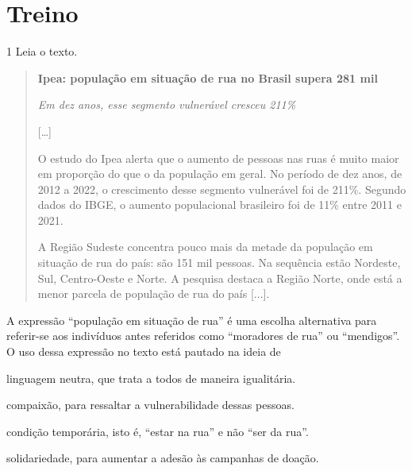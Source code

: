 \section{Treino}

\num{1} Leia o texto.

\begin{quote}
\centering\textbf{Ipea: população em situação de rua no Brasil supera 281 mil}

\centering\emph{Em dez anos, esse segmento vulnerável cresceu 211\%}

{[}\ldots{]}

O estudo do Ipea alerta que o aumento de pessoas nas ruas é muito maior
em proporção do que o da população em geral. No período de dez anos, de
2012 a 2022, o crescimento desse segmento vulnerável foi de 211\%.
Segundo dados do IBGE, o aumento populacional brasileiro foi de 11\%
entre 2011 e 2021.

A Região Sudeste concentra pouco mais da metade da população em situação
de rua do país: são 151 mil pessoas. Na sequência estão Nordeste, Sul,
Centro-Oeste e Norte. A pesquisa destaca a Região Norte, onde está a
menor parcela de população de rua do país {[}...{]}.

\end{quote}

A expressão ``população em situação de rua'' é uma escolha alternativa
para referir-se aos indivíduos antes referidos como ``moradores de rua''
ou ``mendigos''. O uso dessa expressão no texto está pautado na ideia de

\begin{escolha}

\item linguagem neutra, que trata a todos de maneira igualitária.

\item compaixão, para ressaltar a vulnerabilidade dessas pessoas.

\item condição temporária, isto é, ``estar na rua'' e não ``ser da rua''.

\item solidariedade, para aumentar a adesão às campanhas de doação.

\end{escolha}

